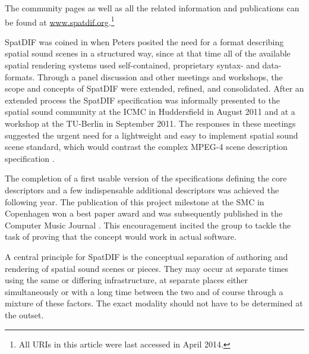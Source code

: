 \documentclass{article}
\begin{document}
The community pages as well as all the related information and publications can be found at \href{http://www.spatdif.org}{www.spatdif.org}.\footnote{All URIs in this article were last accessed in April 2014.}


SpatDIF was coined in \citeyear{peters_caa07} \cite{peters_caa07} when Peters posited the need for a format describing spatial sound scenes in a structured way, since at that time all of the available spatial rendering systems used self-contained, proprietary syntax- and data-formats.
Through a panel discussion \cite{2008ICMCpanel, Peters:2008spatdif} and other meetings and workshops, the scope and concepts of SpatDIF were extended, refined, and consolidated.
After an extended process the SpatDIF specification was informally presented to the spatial sound community at the ICMC in Huddersfield in August 2011 and at a workshop at the TU-Berlin in September 2011.
The responses in these meetings suggested the urgent need for a lightweight and easy to implement spatial sound scene standard, which would contrast the complex MPEG-4 scene description specification \cite{scheirer1999audiobifs}.

The completion of a first usable version of the specifications \cite{SpatDIF_03} defining the core descriptors and a few indispensable additional descriptors was achieved the following year. The publication of this project milestone at the SMC in Copenhagen \cite{SpatDIF_SMC12} won a best paper award and was subsequently published in the Computer Music Journal \cite{Peters:2013SpatDifCMJ}.
This encouragement incited the group to tackle the task of proving that the concept would work in actual software.


A central principle for SpatDIF is the conceptual separation of authoring and rendering of spatial sound scenes or pieces. They may occur at separate times using the same or differing infrastructure, at separate places either simultaneously or with a long time between the two and of course through a mixture of these factors. 
The exact modality should not have to be determined at the outset.
\end{document}
